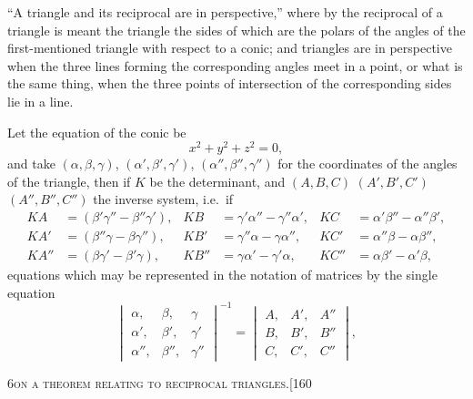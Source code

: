\documentclass[11pt]{article}
\begin{document}
``A triangle and its reciprocal are in perspective,'' where by the reciprocal of a
triangle is meant the triangle the sides of which are the polars of the angles of the
first-mentioned triangle with respect to a conic; and triangles are in perspective when
the three lines forming the corresponding angles meet in a point, or what is the same
thing, when the three points of intersection of the corresponding sides lie in a line.

Let the equation of the conic be
\[
x^{2} + y^{2} + z^{2} = 0,
\]
and take $(\alpha, \beta, \gamma)$, $(\alpha', \beta', \gamma')$, $(\alpha'', \beta'', \gamma'')$ for the coordinates of the angles of
the triangle, then if $K$ be the determinant, and $(A, B, C)$ $(A', B', C')$ $(A'', B'', C'')$ the
inverse system, i.e.\ if
\begin{align*}
KA &= (\beta'\gamma'' - \beta''\gamma'), & KB &= \gamma'\alpha'' - \gamma''\alpha', & KC &= \alpha'\beta'' - \alpha''\beta',\\
KA' &= (\beta''\gamma - \beta\gamma''), & KB' &= \gamma''\alpha - \gamma\alpha'', & KC' &= \alpha''\beta - \alpha\beta'',\\
KA'' &= (\beta\gamma' - \beta'\gamma), & KB'' &= \gamma\alpha' - \gamma'\alpha, & KC'' &= \alpha\beta' - \alpha'\beta,
\end{align*}
equations which may be represented in the notation of matrices by the single equation
\[
\begin{vmatrix}
\alpha, & \beta, & \gamma\\
\alpha', & \beta', & \gamma'\\
\alpha'', & \beta'', & \gamma''
\end{vmatrix}^{-1}
=
\begin{vmatrix}
A, & A', & A''\\
B, & B', & B''\\
C, & C', & C''
\end{vmatrix},
\]

\newpage

\begin{center}
\small\textsc{6}\hfill\textsc{on a theorem relating to reciprocal triangles.}\hfill[160
\end{center}

\medskip
\end{document}
